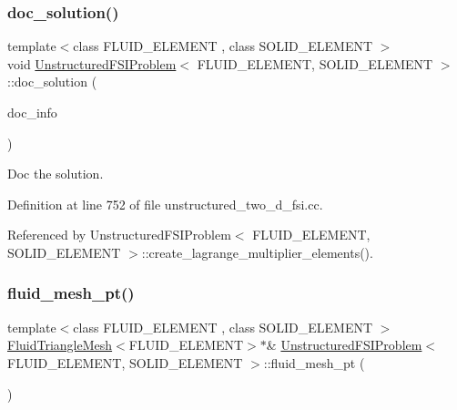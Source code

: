 \mbox{\label{classUnstructuredFSIProblem_a15f581318b505de07f50bd570da8c8d0}} 
\subsubsection{\texorpdfstring{doc\+\_\+solution()}{doc\_solution()}}
{\footnotesize\ttfamily template$<$class F\+L\+U\+I\+D\+\_\+\+E\+L\+E\+M\+E\+NT , class S\+O\+L\+I\+D\+\_\+\+E\+L\+E\+M\+E\+NT $>$ \\
void \hyperlink{classUnstructuredFSIProblem}{Unstructured\+F\+S\+I\+Problem}$<$ F\+L\+U\+I\+D\+\_\+\+E\+L\+E\+M\+E\+NT, S\+O\+L\+I\+D\+\_\+\+E\+L\+E\+M\+E\+NT $>$\+::doc\+\_\+solution (\begin{DoxyParamCaption}\item[{Doc\+Info \&}]{doc\+\_\+info }\end{DoxyParamCaption})}



Doc the solution. 



Definition at line 752 of file unstructured\+\_\+two\+\_\+d\+\_\+fsi.\+cc.



Referenced by Unstructured\+F\+S\+I\+Problem$<$ F\+L\+U\+I\+D\+\_\+\+E\+L\+E\+M\+E\+N\+T, S\+O\+L\+I\+D\+\_\+\+E\+L\+E\+M\+E\+N\+T $>$\+::create\+\_\+lagrange\+\_\+multiplier\+\_\+elements().

\mbox{\label{classUnstructuredFSIProblem_afe86a739cadf57036a0bf351ed9bc1a9}} 
\subsubsection{\texorpdfstring{fluid\+\_\+mesh\+\_\+pt()}{fluid\_mesh\_pt()}}
{\footnotesize\ttfamily template$<$class F\+L\+U\+I\+D\+\_\+\+E\+L\+E\+M\+E\+NT , class S\+O\+L\+I\+D\+\_\+\+E\+L\+E\+M\+E\+NT $>$ \\
\hyperlink{classFluidTriangleMesh}{Fluid\+Triangle\+Mesh}$<$F\+L\+U\+I\+D\+\_\+\+E\+L\+E\+M\+E\+NT$>$$\ast$\& \hyperlink{classUnstructuredFSIProblem}{Unstructured\+F\+S\+I\+Problem}$<$ F\+L\+U\+I\+D\+\_\+\+E\+L\+E\+M\+E\+NT, S\+O\+L\+I\+D\+\_\+\+E\+L\+E\+M\+E\+NT $>$\+::fluid\+\_\+mesh\+\_\+pt (\begin{DoxyParamCaption}{ }\end{DoxyParamCaption})\hspace{0.3cm}{\ttfamily [inline]}}



